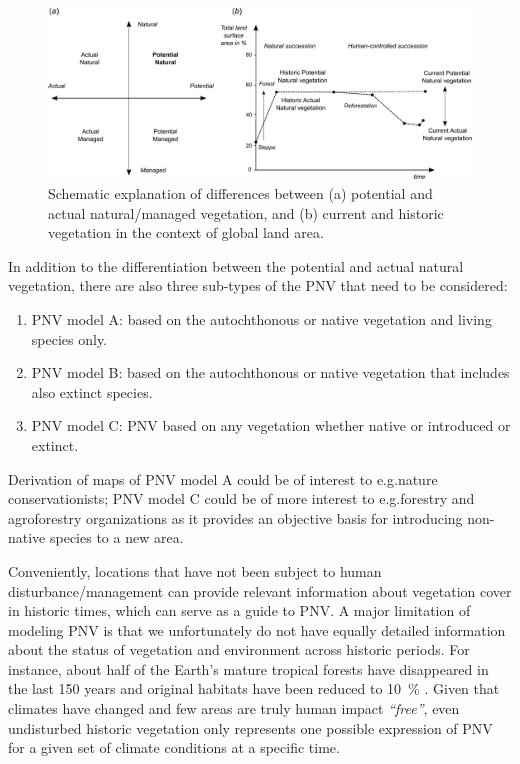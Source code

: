 \documentclass[fleqn,10pt,lineno]{wlpeerj} %
\begin{document}
\begin{figure}[!hbt]
\centering
\includegraphics[width=\linewidth]{Fig_1.pdf}
\caption{Schematic explanation of differences between (a) potential and actual natural/managed vegetation, and (b) current and historic vegetation in the context of global land area.}
\label{Fig_concepts_PNV}
\end{figure}

In addition to the differentiation between the potential and actual natural vegetation, there are also three sub-types of the PNV that need to be considered:

\begin{enumerate}
\item PNV model A: based on the autochthonous or native vegetation and living species only.
\item PNV model B: based on the autochthonous or native vegetation that includes also extinct species.
\item PNV model C: PNV based on any vegetation whether native or introduced or extinct.
\end{enumerate}

Derivation of maps of PNV model A could be of interest to e.g.\@ nature conservationists; PNV model C could be of more interest to e.g.\@ forestry and agroforestry organizations as it provides an objective basis for introducing non-native species to a new area.\par 

Conveniently, locations that have not been subject to human disturbance/management can provide relevant information about vegetation cover in historic times, which can serve as a guide to PNV. A major limitation of modeling PNV is that we unfortunately do not have equally detailed information about the status of vegetation and environment across historic periods. For instance, about half of the Earth's mature tropical forests have disappeared in the last 150 years and original habitats have been reduced to \SI{10}{\percent} \citep{hansen2013high}. Given that climates have changed and few areas are truly human impact \emph{``free''}, even undisturbed historic vegetation only represents one possible expression of PNV for a given set of climate conditions at a specific time. \par
\end{document}
